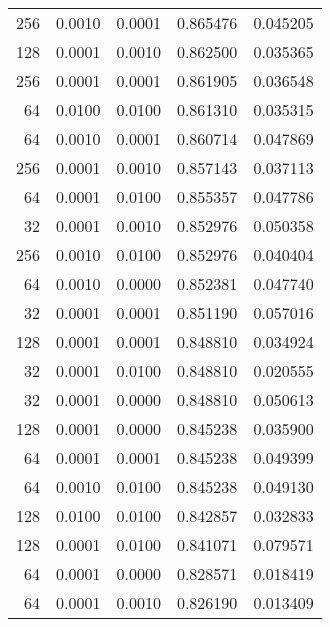 \begin{tabular}{rrrrr}
 256 &  0.0010 &  0.0001 &  0.865476 &  0.045205 \\
 128 &  0.0001 &  0.0010 &  0.862500 &  0.035365 \\
 256 &  0.0001 &  0.0001 &  0.861905 &  0.036548 \\
  64 &  0.0100 &  0.0100 &  0.861310 &  0.035315 \\
  64 &  0.0010 &  0.0001 &  0.860714 &  0.047869 \\
 256 &  0.0001 &  0.0010 &  0.857143 &  0.037113 \\
  64 &  0.0001 &  0.0100 &  0.855357 &  0.047786 \\
  32 &  0.0001 &  0.0010 &  0.852976 &  0.050358 \\
 256 &  0.0010 &  0.0100 &  0.852976 &  0.040404 \\
  64 &  0.0010 &  0.0000 &  0.852381 &  0.047740 \\
  32 &  0.0001 &  0.0001 &  0.851190 &  0.057016 \\
 128 &  0.0001 &  0.0001 &  0.848810 &  0.034924 \\
  32 &  0.0001 &  0.0100 &  0.848810 &  0.020555 \\
  32 &  0.0001 &  0.0000 &  0.848810 &  0.050613 \\
 128 &  0.0001 &  0.0000 &  0.845238 &  0.035900 \\
  64 &  0.0001 &  0.0001 &  0.845238 &  0.049399 \\
  64 &  0.0010 &  0.0100 &  0.845238 &  0.049130 \\
 128 &  0.0100 &  0.0100 &  0.842857 &  0.032833 \\
 128 &  0.0001 &  0.0100 &  0.841071 &  0.079571 \\
  64 &  0.0001 &  0.0000 &  0.828571 &  0.018419 \\
  64 &  0.0001 &  0.0010 &  0.826190 &  0.013409 \\
\bottomrule
\end{tabular}

